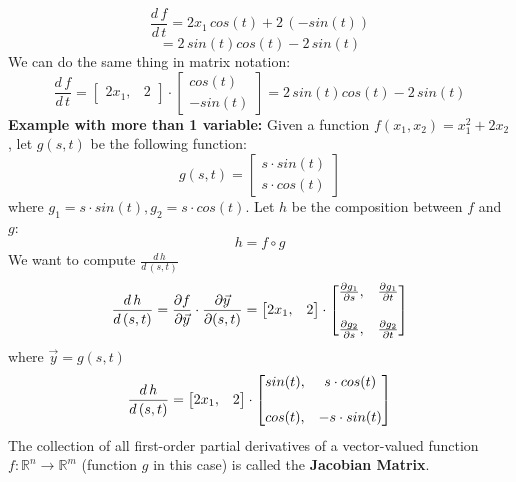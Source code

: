 \[\frac{d \,f}{d\,t} = 2x_1\,cos(t) + 2\,(-sin(t))\]
\[= 2 \, sin(t)cos(t) - 2 \, sin(t)\]
We can do the same thing in matrix notation:
\[\frac{d \, f}{d \, t} = 
    \begin{bmatrix}
        2x_1, & 2
    \end{bmatrix}
    \cdot
    \begin{bmatrix}
        cos(t) \\
        - sin(t)
    \end{bmatrix}
    = 2 \, sin(t)cos(t) - 2 \, sin(t)
\]
\textbf{Example with more than 1 variable:}\newline
Given a function $f(x_1, x_2) = x_1^{2} + 2x_2$, let $g(s, t)$ be the following function:
\[
    g(s, t) = 
    \begin{bmatrix}
        s \cdot sin(t) \\
        s \cdot cos(t)
    \end{bmatrix}
\]
where $g_1 = s \cdot sin(t), g_2 = s \cdot cos(t)$. Let $h$ be the composition between $f$ and $g$:
\[h = f \circ g\]
We want to compute $\frac{d \, h}{d\,(s,t)}$
\[
    \frac{d \, h}{d\,(s,t)} = \frac{\partial f}{\partial \Vec{y}} \cdot \frac{\partial \Vec{y}}{\partial (s, t)} = 
    \begin{bmatrix}
        2x_1, & 2
    \end{bmatrix}
    \cdot
    \begin{bmatrix}
        \frac{\partial g_1}{\partial s}, & \frac{\partial g_1}{\partial t} \\
        \vspace{2pt}\\
        \frac{\partial g_2}{\partial s}, & \frac{\partial g_2}{\partial t}
    \end{bmatrix}
\]
where $\Vec{y} = g(s,t)$
\[
    \frac{d \, h}{d\,(s,t)} =
    \begin{bmatrix}
        2x_1, & 2
    \end{bmatrix}
    \cdot
    \begin{bmatrix}
        sin(t), & s \cdot cos(t)\\
        \vspace{1pt}\\
        cos(t), & -s \cdot sin(t)
    \end{bmatrix}
\]
The collection of all first-order partial derivatives of a vector-valued function $f: \mathbb{R}^n \rightarrow \mathbb{R}^m$ (function $g$ in this case) is called the \textbf{Jacobian Matrix}.

